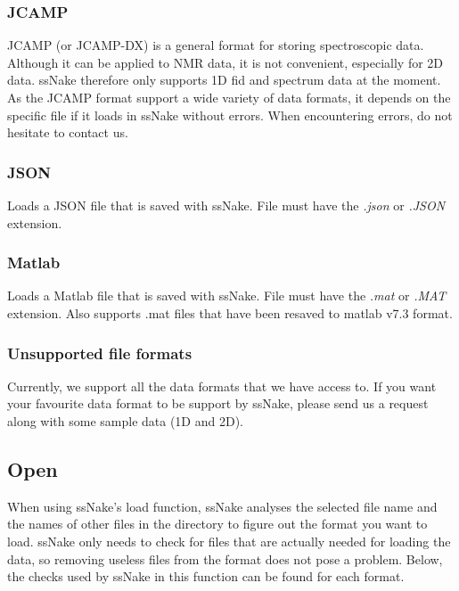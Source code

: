 \documentclass[11pt,a4paper]{article}
\begin{document}
\subsubsection*{JCAMP}
JCAMP (or JCAMP-DX) is a general format for storing spectroscopic data. Although it can be applied to NMR data, it is not convenient, especially for 2D data. ssNake therefore only supports 1D fid and spectrum data at the moment. As the JCAMP format support a wide variety of data formats, it depends on the specific file if it loads in ssNake without errors. When encountering errors, do not hesitate to contact us.

\subsubsection*{JSON}
Loads a JSON file that is saved with ssNake. File must have the \textit{.json} or \textit{.JSON} extension.

\subsubsection*{Matlab}
Loads a Matlab file that is saved with ssNake. File must have the \textit{.mat} or \textit{.MAT} extension. Also supports .mat files that have been resaved to matlab v7.3 format.


\subsubsection*{Unsupported file formats}
Currently, we support all the data formats that we have access to. If you want your favourite data format to be support by ssNake, please send us a request along with some sample data (1D and 2D).

\subsection{Open}
When using ssNake's load function, ssNake analyses the selected file name and the names of other files in the directory to figure out the format you want to load. ssNake only needs to check for files that are actually needed for loading the data, so removing useless files from the format does not pose a problem. Below, the checks used by ssNake in this function can be found for each format.
\end{document}
